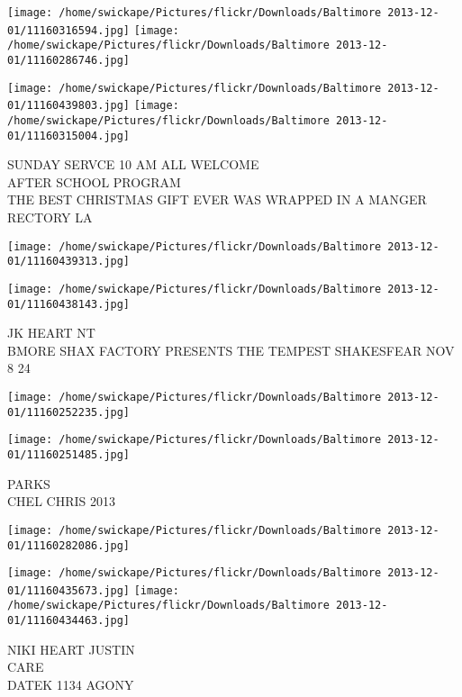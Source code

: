 \documentclass[10pt,letterpaper]{article}
\begin{document}
\texttt{[image: /home/swickape/Pictures/flickr/Downloads/Baltimore 2013-12-01/11160316594.jpg]}
\texttt{[image: /home/swickape/Pictures/flickr/Downloads/Baltimore 2013-12-01/11160286746.jpg]}

\texttt{[image: /home/swickape/Pictures/flickr/Downloads/Baltimore 2013-12-01/11160439803.jpg]}
\texttt{[image: /home/swickape/Pictures/flickr/Downloads/Baltimore 2013-12-01/11160315004.jpg]}

SUNDAY SERVCE 10 AM ALL WELCOME\\
AFTER SCHOOL PROGRAM\\
THE BEST CHRISTMAS GIFT EVER WAS WRAPPED IN A MANGER\\
RECTORY LA\\
\pagebreak

\texttt{[image: /home/swickape/Pictures/flickr/Downloads/Baltimore 2013-12-01/11160439313.jpg]}

\vspace{0.25in}
\texttt{[image: /home/swickape/Pictures/flickr/Downloads/Baltimore 2013-12-01/11160438143.jpg]}

JK HEART NT\\
BMORE SHAX FACTORY PRESENTS THE TEMPEST SHAKESFEAR NOV 8 24\\
\pagebreak

\texttt{[image: /home/swickape/Pictures/flickr/Downloads/Baltimore 2013-12-01/11160252235.jpg]}

\vspace{0.25in}
\texttt{[image: /home/swickape/Pictures/flickr/Downloads/Baltimore 2013-12-01/11160251485.jpg]}

PARKS\\
CHEL CHRIS 2013\\
\pagebreak

\texttt{[image: /home/swickape/Pictures/flickr/Downloads/Baltimore 2013-12-01/11160282086.jpg]}

\vspace{0.25in}
\texttt{[image: /home/swickape/Pictures/flickr/Downloads/Baltimore 2013-12-01/11160435673.jpg]}
\texttt{[image: /home/swickape/Pictures/flickr/Downloads/Baltimore 2013-12-01/11160434463.jpg]}

NIKI HEART JUSTIN\\
CARE\\
DATEK 1134 AGONY\\
\pagebreak
\end{document}
